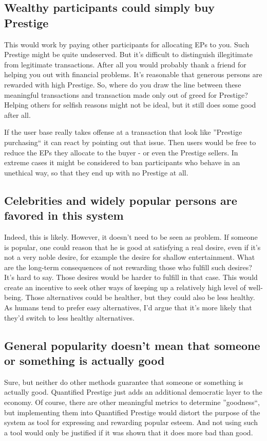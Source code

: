 \documentclass[a4paper,12pt]{scrartcl}
\newcounter{example}
\begin{document}
\subsection{Wealthy participants could simply buy Prestige}
This would work by paying other participants for allocating EPs to you. Such Prestige might be quite undeserved. But it's difficult to distinguish illegitimate from legitimate transactions. After all you would probably thank a friend for helping you out with financial problems. It's reasonable that generous persons are rewarded with high Prestige. So, where do you draw the line between these meaningful transactions and transaction made only out of greed for Prestige? Helping others for selfish reasons might not be ideal, but it still does some good after all.

If the user base really takes offense at a transaction that look like ''Prestige purchasing`` it can react by pointing out that issue. Then users would be free to reduce the EPs they allocate to the buyer - or even the Prestige sellers. In extreme cases it might be considered to ban participants who behave in an unethical way, so that they end up with no Prestige at all.

\subsection{Celebrities and widely popular persons are favored in this system}
Indeed, this is likely. However, it doesn't need to be seen as problem. If someone is popular, one could reason that he is good at satisfying a real desire, even if it's not a very noble desire, for example the desire for shallow entertainment. What are the long-term consequences of not rewarding those who fulfill such desires? It's hard to say. Those desires would be harder to fulfill in that case. This would create an incentive to seek other ways of keeping up a relatively high level of well-being. Those alternatives could be healther, but they could also be less healthy. As humans tend to prefer easy alternatives, I'd argue that it's more likely that they'd switch to less healthy alternatives.

\subsection{General popularity doesn't mean that someone or something is actually good} 
Sure, but neither do other methods guarantee that someone or something is actually good. Quantified Prestige just adds an additional democratic layer to the economy. Of course, there are other meaningful metrics to determine ''goodness``, but implementing them into Quantified Prestige would distort the purpose of the system as tool for expressing and rewarding popular esteem. And not using such a tool would only be justified if it was shown that it does more bad than good.
\end{document}
